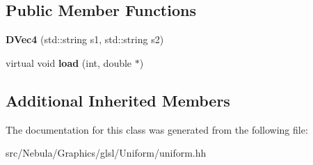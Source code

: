 \subsection*{Public Member Functions}
\begin{DoxyCompactItemize}
\item 
\hypertarget{classNeb_1_1glsl_1_1Uniform_1_1Vector_1_1DVec4_a254fb963ff4b99ac68c62d89c67e717d}{{\bfseries D\-Vec4} (std\-::string s1, std\-::string s2)}\label{classNeb_1_1glsl_1_1Uniform_1_1Vector_1_1DVec4_a254fb963ff4b99ac68c62d89c67e717d}

\item 
\hypertarget{classNeb_1_1glsl_1_1Uniform_1_1Vector_1_1DVec4_ab03fde9830f3d081d04523701da594e3}{virtual void {\bfseries load} (int, double $\ast$)}\label{classNeb_1_1glsl_1_1Uniform_1_1Vector_1_1DVec4_ab03fde9830f3d081d04523701da594e3}

\end{DoxyCompactItemize}
\subsection*{Additional Inherited Members}


The documentation for this class was generated from the following file\-:\begin{DoxyCompactItemize}
\item 
src/\-Nebula/\-Graphics/glsl/\-Uniform/uniform.\-hh\end{DoxyCompactItemize}
